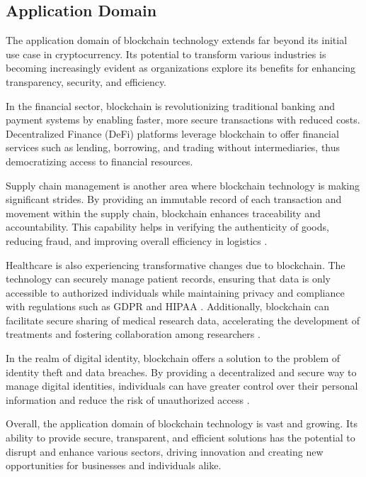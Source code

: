 \documentclass[../main.tex]{subfiles}
\begin{document}
\subsection{Application Domain}

The application domain of blockchain technology extends far beyond its initial use case in cryptocurrency. Its potential to transform various industries is becoming increasingly evident as organizations explore its benefits for enhancing transparency, security, and efficiency.

In the financial sector, blockchain is revolutionizing traditional banking and payment systems by enabling faster, more secure transactions with reduced costs. Decentralized Finance (DeFi) platforms leverage blockchain to offer financial services such as lending, borrowing, and trading without intermediaries, thus democratizing access to financial resources.

Supply chain management is another area where blockchain technology is making significant strides. By providing an immutable record of each transaction and movement within the supply chain, blockchain enhances traceability and accountability. This capability helps in verifying the authenticity of goods, reducing fraud, and improving overall efficiency in logistics \cite{BlockchainHealthcareExamples2022}.

Healthcare is also experiencing transformative changes due to blockchain. The technology can securely manage patient records, ensuring that data is only accessible to authorized individuals while maintaining privacy and compliance with regulations such as GDPR and HIPAA \cite{BlockchainHealthcare2021}. Additionally, blockchain can facilitate secure sharing of medical research data, accelerating the development of treatments and fostering collaboration among researchers \cite{BlockchainHealthcareExamples2022}.

In the realm of digital identity, blockchain offers a solution to the problem of identity theft and data breaches. By providing a decentralized and secure way to manage digital identities, individuals can have greater control over their personal information and reduce the risk of unauthorized access \cite{BlockchainHealthcareExamples2022}.

Overall, the application domain of blockchain technology is vast and growing. Its ability to provide secure, transparent, and efficient solutions has the potential to disrupt and enhance various sectors, driving innovation and creating new opportunities for businesses and individuals alike.
\end{document}
